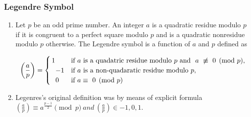 \subsubsection{Legendre Symbol}\begin{enumerate}

            
            \item 
                Let $\displaystyle p$ be an odd prime number. An integer $\displaystyle a$ is a quadratic residue
                    modulo
                    $\displaystyle p$ if it is congruent to a perfect square modulo $\displaystyle p$ and is a quadratic
                    nonresidue modulo $\displaystyle p$ otherwise. The Legendre symbol is a function of $\displaystyle
                    a$
                    and
                    $\displaystyle p$ defined as

                \[\displaystyle \displaystyle \left( \frac{a}{p} \right)=
                {\begin{cases}
                \,1&{\text{if }}a\ {\text{is a quadatric residue modulo }}p\ {\text{and }}\ a\ \not\equiv\ 0
                {\pmod{p}},\\\;\;\,-1&{\text{if }}a\ {\text{is a non-quadaratic residue modulo
                }}p,\\\;\;\,0&{\text{if
                }}a \equiv\ 0 {\pmod{p}}
                \end{cases}}\]
            
            \item 
                Legenres’s original definition was by means of explicit formula
                    $\displaystyle \left(\right)\equiv a^{}  \ and \
                    \left(\right).$


\end{enumerate}
